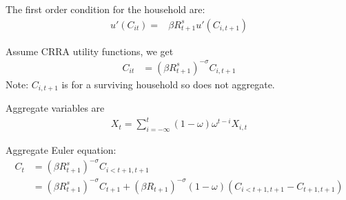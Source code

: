 \documentclass[11pt]{article}
\begin{document}


The first order condition for the household are:
%
\begin{align*}
	u'(C_{it})=&\beta  R_{t+1}^s u'(C_{i,t+1}) 
\end{align*}

Assume CRRA utility functions, we get
\begin{align*}
	C_{it} &= (\beta R_{t+1}^s)^{-\sigma}C_{i,t+1} 
\end{align*}
Note: $C_{i,t+1}$ is for a surviving household so does not aggregate.


Aggregate variables are 
\begin{align*}
	X_t = \sum_{i=-\infty}^{t}(1-\omega)\omega^{t-i}X_{i,t}
\end{align*}

Aggregate Euler equation:
\begin{align*}
    C_{t} &= (\beta R_{t+1}^s)^{-\sigma}C_{i<t+1,t+1} \\
    &=(\beta R_{t+1}^s)^{-\sigma}C_{t+1} +(\beta R_{t+1})^{-\sigma} (1-\omega)(C_{i<t+1,t+1}-C_{t+1,t+1}) \\
\end{align*}
\end{document}
